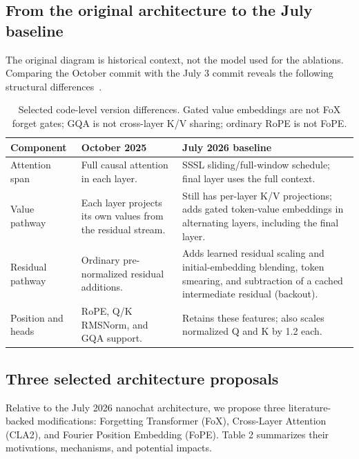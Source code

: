 \documentclass[11pt]{article}
\begin{document}
\subsection{From the original architecture to the July baseline}
The original diagram is historical context, not the model used for the
ablations. Comparing the October commit with the July 3 commit reveals the
following structural differences~\cite{nanochat-code,nanochat-july}.
\begin{table}[htbp]
\centering
\small
\begin{tabularx}{\linewidth}{@{}p{2.4cm}XX@{}}
\hline
Component & October 2025 & July 2026 baseline\\
\hline
Attention span & Full causal attention in each layer.
& SSSL sliding/full-window schedule; final layer uses the full context.\\
Value pathway & Each layer projects its own values from the residual stream.
& Still has per-layer K/V projections; adds gated token-value embeddings
in alternating layers, including the final layer.\\
Residual pathway & Ordinary pre-normalized residual additions.
& Adds learned residual scaling and initial-embedding blending, token
smearing, and subtraction of a cached intermediate residual (backout).\\
Position and heads & RoPE, Q/K RMSNorm, and GQA support.
& Retains these features; also scales normalized Q and K by 1.2 each.\\
\hline
\end{tabularx}
\caption{Selected code-level version differences. Gated value embeddings
are not FoX forget gates; GQA is not cross-layer K/V sharing; ordinary RoPE
is not FoPE.}
\end{table}

\subsection{Three selected architecture proposals}
Relative to the July 2026 nanochat architecture, we propose three literature-backed modifications: Forgetting Transformer (FoX), Cross-Layer Attention (CLA2), and Fourier Position Embedding (FoPE). Table 2 summarizes their motivations, mechanisms, and potential impacts.
\end{document}
